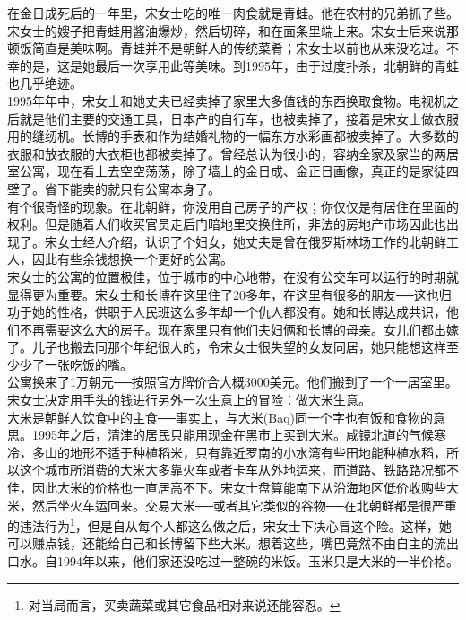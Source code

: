在金日成死后的一年里，宋女士吃的唯一肉食就是青蛙。他在农村的兄弟抓了些。宋女士的嫂子把青蛙用酱油爆炒，然后切碎，和在面条里端上来。宋女士后来说那顿饭简直是美味啊。青蛙并不是朝鲜人的传统菜肴；宋女士以前也从来没吃过。不幸的是，这是她最后一次享用此等美味。到1995年，由于过度扑杀，北朝鲜的青蛙也几乎绝迹。\\

1995年年中，宋女士和她丈夫已经卖掉了家里大多值钱的东西换取食物。电视机之后就是他们主要的交通工具，日本产的自行车，也被卖掉了，接着是宋女士做衣服用的缝纫机。长博的手表和作为结婚礼物的一幅东方水彩画都被卖掉了。大多数的衣服和放衣服的大衣柜也都被卖掉了。曾经总认为很小的，容纳全家及家当的两居室公寓，现在看上去空空荡荡，除了墙上的金日成、金正日画像，真正的是家徒四壁了。省下能卖的就只有公寓本身了。\\

有个很奇怪的现象。在北朝鲜，你没用自己房子的产权；你仅仅是有居住在里面的权利。但是随着人们收买官员走后门暗地里交换住所，非法的房地产市场因此也出现了。宋女士经人介绍，认识了个妇女，她丈夫是曾在俄罗斯林场工作的北朝鲜工人，因此有些余钱想换一个更好的公寓。\\

宋女士的公寓的位置极佳，位于城市的中心地带，在没有公交车可以运行的时期就显得更为重要。宋女士和长博在这里住了20多年，在这里有很多的朋友──这也归功于她的性格，供职于人民班这么多年却一个仇人都没有。她和长博达成共识，他们不再需要这么大的房子。现在家里只有他们夫妇俩和长博的母亲。女儿们都出嫁了。儿子也搬去同那个年纪很大的，令宋女士很失望的女友同居，她只能想这样至少少了一张吃饭的嘴。\\

公寓换来了1万朝元──按照官方牌价合大概3000美元。他们搬到了一个一居室里。宋女士决定用手头的钱进行另外一次生意上的冒险：做大米生意。\\

大米是朝鲜人饮食中的主食──事实上，与大米(Baq)同一个字也有饭和食物的意思。1995年之后，清津的居民只能用现金在黑市上买到大米。咸镜北道的气候寒冷，多山的地形不适于种植稻米，只有靠近罗南的小水湾有些田地能种植水稻，所以这个城市所消费的大米大多靠火车或者卡车从外地运来，而道路、铁路路况都不佳，因此大米的价格也一直居高不下。宋女士盘算能南下从沿海地区低价收购些大米，然后坐火车运回来。交易大米──或者其它类似的谷物──在北朝鲜都是很严重的违法行为\footnote{对当局而言，买卖蔬菜或其它食品相对来说还能容忍。}，但是自从每个人都这么做之后，宋女士下决心冒这个险。这样，她可以赚点钱，还能给自己和长博留下些大米。想着这些，嘴巴竟然不由自主的流出口水。自1994年以来，他们家还没吃过一整碗的米饭。玉米只是大米的一半价格。\\

